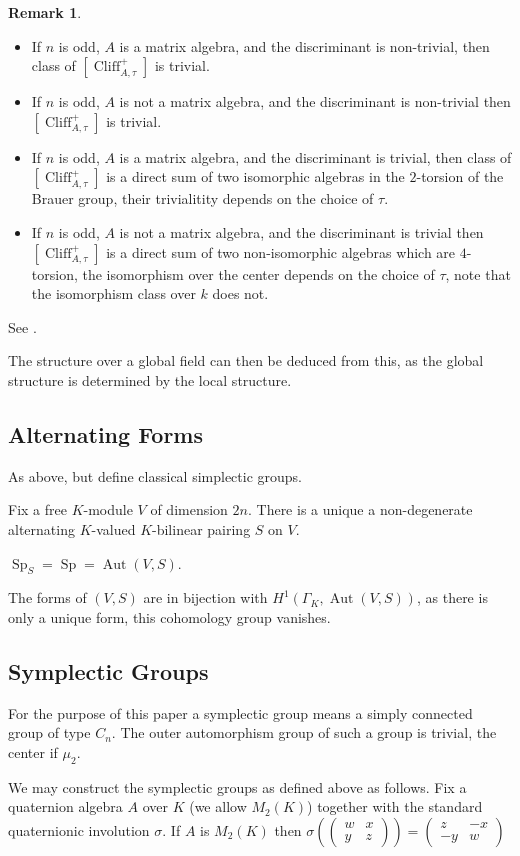 \documentclass{article}
\theoremstyle{plain}
\theoremstyle{definition}
\newtheorem{remark}[theorem]{Remark}
\numberwithin{equation}{section}
\DeclareMathOperator{\Aut}{Aut}
\DeclareMathOperator{\Sp}{Sp}
\DeclareMathOperator{\Clif}{Cliff}
\newcommand{\GalKbK}{\Gamma_K}
\begin{document}
\begin{remark}
\begin{itemize}
\item If $n$ is odd, $A$ is a matrix algebra, and the discriminant is non-trivial, then class of $[\Clif^+_{A,\tau}]$ is trivial.
\item If $n$ is odd, $A$ is not a matrix algebra, and the discriminant is non-trivial then $[\Clif^+_{A,\tau}]$ is trivial.
\item If $n$ is odd, $A$ is a matrix algebra, and the discriminant is trivial, then class of $[\Clif^+_{A,\tau}]$ is a direct sum of two isomorphic algebras in the $2$-torsion of the Brauer group, their trivialitity depends on the choice of $\tau$.
\item If $n$ is odd, $A$ is not a matrix algebra, and the discriminant is trivial then $[\Clif^+_{A,\tau}]$ is a direct sum of two non-isomorphic algebras which are $4$-torsion, the isomorphism over the center depends on the choice of $\tau$, note that the isomorphism class over $k$ does not.
\end{itemize}
See \cite[Thm 9.12]{book_of_involutions}.

The structure over a global field can then be deduced from this, as the global structure is determined by the local structure.
\end{remark}


\subsection{Alternating Forms}

As above, but define classical simplectic groups.

Fix a free $K$-module $V$ of dimension $2n$. There is a unique a non-degenerate alternating $K$-valued $K$-bilinear pairing $S$ on $V$.

$\Sp_S = \Sp = \Aut(V,S)$.

The forms of $(V,S)$ are in bijection with $H^1(\GalKbK, \Aut(V,S))$, as there is only a unique form, this cohomology group vanishes.

\subsection{Symplectic Groups}

For the purpose of this paper a symplectic group means a simply connected group of type $C_n$.
The outer automorphism group of such a group is trivial, the center if $\mu_2$.

We may construct the symplectic groups as defined above as follows. Fix a quaternion algebra $A$ over $K$ (we allow $M_2(K)$) together with the standard quaternionic involution $\sigma$. If $A$ is $M_2(K)$ then $\sigma( \left( \begin{smallmatrix} w & x\\ y & z \end{smallmatrix} \right) ) =\left( \begin{smallmatrix}z & {-x}\\ {-y} & w \end{smallmatrix} \right) $
\end{document}
